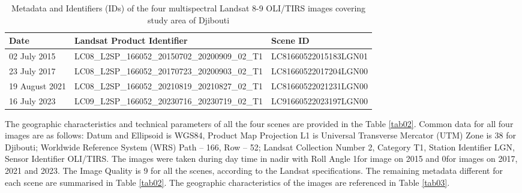 \documentclass[jimaging,article,submit,pdftex,moreauthors]{Definitions/mdpi}
\begin{document}
\begin{table}[H]
\caption{Metadata and Identifiers (IDs) of the four multispectral Landsat 8-9 OLI/TIRS images covering study area of Djibouti}
\label{tab01}
\setlength\tabcolsep{0pt}
\begin{tabularx}{\textwidth}{ X l X }
\textbf{Date} & \textbf{Landsat Product Identifier} & \textbf{Scene ID} \\
\midrule
	02 July 2015 & LC08\_L2SP\_166052\_20150702\_20200909\_02\_T1 & LC81660522015183LGN01 \\
	23 July 2017 &  LC08\_L2SP\_166052\_20170723\_20200903\_02\_T1 & LC81660522017204LGN00 \\
	19 August 2021 & LC08\_L2SP\_166052\_20210819\_20210827\_02\_T1 & LC81660522021231LGN00 \\
	16 July 2023 & LC09\_L2SP\_166052\_20230716\_20230719\_02\_T1 & LC91660522023197LGN00 \\
\bottomrule
\end{tabularx}
\end{table} 

The geographic characteristics and technical parameters of all the four scenes are provided in the Table \ref{tab02}. Common data for all four images are as follows: Datum and Ellipsoid is WGS84, Product Map Projection L1 is Universal Transverse Mercator (UTM) Zone is 38 for Djibouti;  Worldwide Reference System (WRS) Path -- 166, Row -- 52; Landsat Collection Number 2, Category T1, Station Identifier LGN, Sensor Identifier OLI/TIRS. The images were taken during day time in nadir with Roll Angle 1\degree  for image on 2015 and 0\degree for images on 2017, 2021 and 2023. The Image Quality is 9 for all the scenes, according to the Landsat specifications. The remaining metadata different for each scene are summarised in Table \ref{tab02}. The geographic characteristics of the images are referenced in Table \ref{tab03}. 
\end{document}

